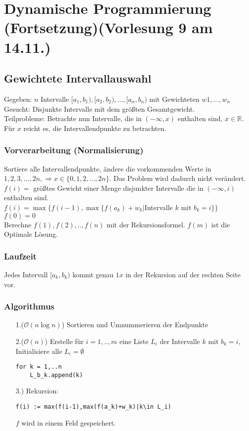 \section{Dynamische Programmierung (Fortsetzung)\tiny (Vorlesung 9 am 14.11.)}

\subsection{Gewichtete Intervallauswahl}
Gegeben: $n$ Intervalle $[a_1,b_1),[a_2,b_2),...,[a_n,b_n)$ mit Gewichteten $w1,...,w_n$\\
Gesucht: Disjunkte Intervalle mit dem größten Gesamtgewicht.\\
Teilprobleme: Betrachte nun Intervalle, die in $(-\infty, x)$ enthalten sind, $x \in \mathbb{R}$. Für $x$ reicht es, die Intervallendpunkte zu betrachten.\\
\subsubsection{Vorverarbeitung (Normalisierung)}
Sortiere alle Intervallendpunkte, ändere die vorkommenden Werte in $1,2,3,...,2n, \Rightarrow x \in \{0,1,2,...,2n\}$. Das Problem wird dadurch nicht verändert.\\
$f(i)=$ größtes Gewicht einer Menge disjunkter Intervalle die in $(- \infty, i)$ enthalten sind.\\
$f(i) = \max \{ f(i-1), \max \{f(a_k)+w_k|$Intervalle $k$ mit $b_k=i\}\}$\\
$f(0)=0$\\
Berechne $f(1),f(2),..,f(n)$ mit der Rekursionsformel. $f(m)$ ist die Optimale Lösung.\\
\subsubsection{Laufzeit}
Jedes Intervall $[a_k,b_k)$ kommt genau $1x$ in der Rekursion auf der rechten Seite vor.\\
\subsubsection{Algorithmus}
\begin{enumerate}
\item[1.($\mathcal{O}(n \log n)$)] Sortieren und Umnummerieren der Endpunkte 
\item[2.($\mathcal{O}(n)$)] Erstelle für $i=1,..,m$ eine Liste $L_i$ der Intervalle $k$ mit $b_k=i$, Initialisiere alle $L_i=\emptyset$\\
\begin{lstlisting}
for k = 1,..n
	L_b_k.append(k)
\end{lstlisting}
\item[3.)] Rekursion:
\begin{lstlisting}
f(i) := max(f(i-1),max(f(a_k)+w_k)|k\in L_i)
\end{lstlisting}
$f$ wird in einem Feld gespeichert.\\
\end{enumerate}

